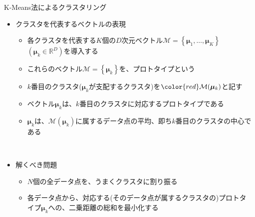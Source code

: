 \documentclass[dvipdfmx,notheorems,t]{beamer}
\begin{document}
\begin{frame}{K-Means法によるクラスタリング}

\begin{itemize}
	\item クラスタを代表するベクトルの表現
	\begin{itemize}
		\item 各クラスタを代表する$K$個の$D$次元ベクトル$\mathcal{M} = \left\{ \bm{\mu}_1, \ldots, \bm{\mu}_K \right\}$ $(\bm{\mu}_k \in \mathbb{R}^D)$を導入する
		\item これらのベクトル$\mathcal{M} = \left\{ \bm{\mu}_k \right\}$を、\alert{プロトタイプ}という
		\item $k$番目のクラスタ($\bm{\mu}_k$が支配するクラスタ)を$\color{red} \mathcal{M}(\bm{\mu}_k)$と記す
		\newline
		\item ベクトル$\bm{\mu}_k$は、$k$番目のクラスタに対応するプロトタイプである
		\item $\bm{\mu}_k$は、$\mathcal{M}(\bm{\mu}_k)$に属するデータ点の平均、即ち$k$番目のクラスタの中心である
	\end{itemize} \
	
	\item 解くべき問題
	\begin{itemize}
		\item $N$個の全データ点を、うまくクラスタに割り振る
		\item 各データ点から、対応する(そのデータ点が属するクラスタの)プロトタイプ$\bm{\mu}_k$への、二乗距離の総和を最小化する
	\end{itemize}
\end{itemize}

\end{frame}
\end{document}
